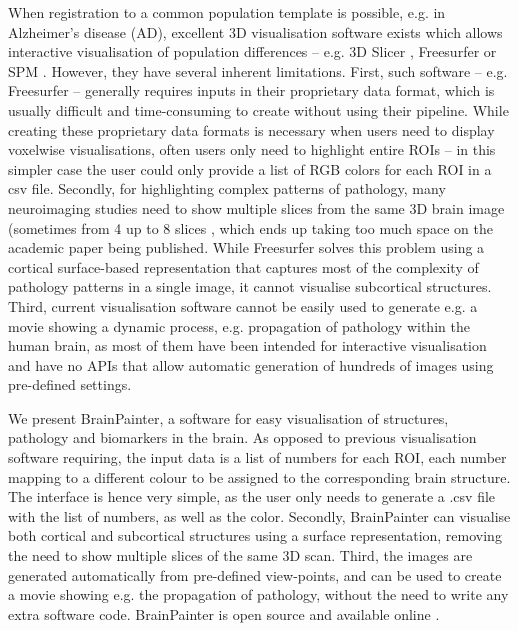 \documentclass{llncs}
\begin{document}
When registration to a common population template is possible, e.g. in Alzheimer's disease (AD), excellent 3D visualisation software exists  which allows interactive visualisation of population differences -- e.g. 3D Slicer \cite{pieper20043d}, Freesurfer \cite{fischl2012freesurfer} or SPM \cite{penny2011statistical}. However, they have several inherent limitations. First, such software -- e.g. Freesurfer -- generally requires inputs in their proprietary data format, which is usually difficult and time-consuming to create without using their pipeline. While creating these proprietary data formats is necessary when users need to display voxelwise visualisations, often users only need to highlight entire ROIs -- in this simpler case the user could only provide a list of RGB colors for each ROI in a csv file. Secondly, for highlighting complex patterns of pathology, many neuroimaging studies need to show multiple slices from the same 3D brain image (sometimes from 4 \cite{seeley2009neurodegenerative} up to 8 slices \cite{migliaccio2015mapping}, which ends up taking too much space on the academic paper being published. While Freesurfer solves this problem using a cortical surface-based representation that captures most of the complexity of pathology patterns in a single image, it cannot visualise subcortical structures. Third, current visualisation software cannot be easily used to generate e.g. a movie showing a dynamic process, e.g. propagation of pathology within the human brain, as most of them have been intended for interactive visualisation and have no APIs that allow automatic generation of hundreds of images using pre-defined settings. 

We present BrainPainter, a software for easy visualisation of structures, pathology and biomarkers in the brain. As opposed to previous visualisation software requiring, the input data is a list of numbers for each ROI, each number mapping to a different colour to be assigned to the corresponding brain structure. The interface is hence very simple, as the user only needs to generate a .csv file with the list of numbers, as well as the color. Secondly, BrainPainter can visualise both cortical and subcortical structures using a surface representation, removing the need to show multiple slices of the same 3D scan. Third, the images are generated automatically from pre-defined view-points, and can be used to create a movie showing e.g. the propagation of pathology, without the need to write any extra software code. BrainPainter is open source and available online \cite{brainPainter}.
\end{document}
